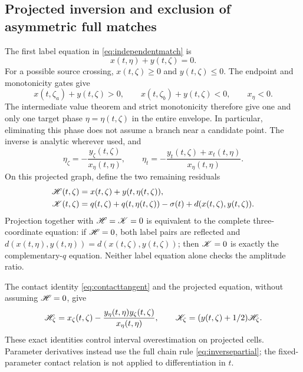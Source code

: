 \subsection{Projected inversion and exclusion of asymmetric full matches}
The first label equation in \eqref{eq:independentmatch} is
\begin{equation}\label{eq:project}
 x(t,\eta)+y(t,\zeta)=0.
\end{equation}
For a possible source crossing, \(x(t,\zeta)\ge0\) and
\(y(t,\zeta)\le0\). The endpoint and monotonicity gates give
\[
 x(t,\zeta_a)+y(t,\zeta)>0,\qquad
 x(t,\zeta_b)+y(t,\zeta)<0,\qquad x_\eta<0.
\]
The intermediate value theorem and strict monotonicity therefore give one
and only one target phase \(\eta=\eta(t,\zeta)\) in the entire envelope.
In particular, eliminating this phase does not assume a branch near a
candidate point. The inverse is analytic wherever used, and
\begin{equation}\label{eq:inversepartial}
 \eta_\zeta=-\frac{y_\zeta(t,\zeta)}{x_\eta(t,\eta)},\qquad
 \eta_t=-\frac{y_t(t,\zeta)+x_t(t,\eta)}{x_\eta(t,\eta)}.
\end{equation}
On this projected graph, define the two remaining residuals
\begin{align}
 \mathscr H(t,\zeta)&=x(t,\zeta)+y(t,\eta(t,\zeta)),\label{eq:HK}\\
 \mathscr K(t,\zeta)&=q(t,\zeta)+q(t,\eta(t,\zeta))
                -\sigma(t)+d(x(t,\zeta),y(t,\zeta)).\notag
\end{align}
Projection together with \(\mathscr H=\mathscr K=0\) is equivalent to the complete
three-coordinate equation: if \(\mathscr H=0\), both label pairs are reflected
and \(d(x(t,\eta),y(t,\eta))=d(x(t,\zeta),y(t,\zeta))\); then \(\mathscr K=0\)
is exactly the complementary-\(q\) equation. Neither label equation alone
checks the amplitude ratio.

The contact identity \eqref{eq:contacttangent} and the projected equation,
without assuming \(\mathscr H=0\), give
\begin{equation}\label{eq:HKderivatives}
 \mathscr H_\zeta=x_\zeta(t,\zeta)
   -\frac{y_\eta(t,\eta)y_\zeta(t,\zeta)}{x_\eta(t,\eta)},\qquad
 \mathscr K_\zeta=(y(t,\zeta)+1/2)\mathscr H_\zeta .
\end{equation}
These exact identities control interval overestimation on projected cells.
Parameter derivatives instead use the full chain rule
\eqref{eq:inversepartial}; the fixed-parameter contact relation is not
applied to differentiation in \(t\).

